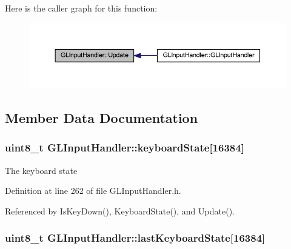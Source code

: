Here is the caller graph for this function\+:\nopagebreak
\begin{figure}[H]
\begin{center}
\leavevmode
\includegraphics[width=350pt]{class_g_l_input_handler_ab0d7e33520356b9de4298e941c3155f6_icgraph}
\end{center}
\end{figure}




\subsection{Member Data Documentation}
\subsubsection[{\texorpdfstring{keyboard\+State}{keyboardState}}]{\setlength{\rightskip}{0pt plus 5cm}uint8\+\_\+t G\+L\+Input\+Handler\+::keyboard\+State\mbox{[}16384\mbox{]}\hspace{0.3cm}{\ttfamily [private]}}\hypertarget{class_g_l_input_handler_a0939fc9cb14210cebfb2b5f57717cef9}{}\label{class_g_l_input_handler_a0939fc9cb14210cebfb2b5f57717cef9}


The keyboard state 



Definition at line 262 of file G\+L\+Input\+Handler.\+h.



Referenced by Is\+Key\+Down(), Keyboard\+State(), and Update().

\subsubsection[{\texorpdfstring{last\+Keyboard\+State}{lastKeyboardState}}]{\setlength{\rightskip}{0pt plus 5cm}uint8\+\_\+t G\+L\+Input\+Handler\+::last\+Keyboard\+State\mbox{[}16384\mbox{]}\hspace{0.3cm}{\ttfamily [private]}}\hypertarget{class_g_l_input_handler_a578a30a739f18db64d1f6716487165f5}{}\label{class_g_l_input_handler_a578a30a739f18db64d1f6716487165f5}



